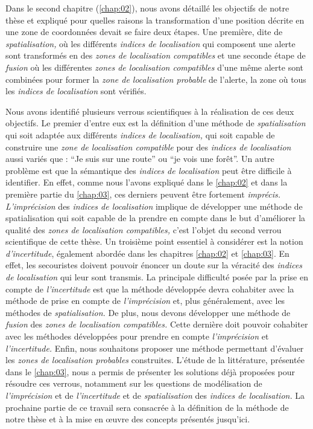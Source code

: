 Dans le second chapitre (\ref{chap:02}), nous avons détaillé les
objectifs de notre thèse et expliqué pour quelles raisons la
transformation d'une position décrite en une zone de coordonnées
devait se faire deux étapes. Une première, dite de
\emph{spatialisation,} où les différents \emph{indices de
  localisation} qui composent une alerte sont transformés en des
\emph{zones de localisation compatibles} et une seconde étape de
\emph{fusion} où les différentes \emph{zones de localisation
  compatibles} d'une même alerte sont combinées pour former la
\emph{zone de localisation probable} de l'alerte, \ie la zone où tous
les \emph{indices de localisation} sont vérifiés.

Nous avons identifié plusieurs verrous scientifiques à la réalisation
de ces deux objectifs. Le premier d'entre eux est la définition d'une
méthode de \emph{spatialisation} qui soit adaptée aux différents
\emph{indices de localisation,} \ie qui soit capable de construire une
\emph{zone de localisation compatible} pour des \emph{indices de
  localisation} aussi variés que : \enquote{Je suis sur une route} ou
\enquote{je vois une forêt}.  Un autre problème est que la sémantique
des \emph{indices de localisation} peut être difficile à
identifier. En effet, comme nous l'avons expliqué dans le
\autoref{chap:02} et dans la première partie du \autoref{chap:03}, ces
derniers peuvent être fortement \emph{imprécis.} \emph{L'imprécision}
des \emph{indices de localisation} implique de développer une méthode
de spatialisation qui soit capable de la prendre en compte dans le but
d'améliorer la qualité des \emph{zones de localisation compatibles,}
c'est l'objet du second verrou scientifique de cette thèse. Un
troisième point essentiel à considérer est la notion
\emph{d'incertitude}, également abordée dans les chapitres
\ref{chap:02} et \ref{chap:03}. En effet, les secouristes doivent
pouvoir énoncer un doute sur la véracité des \emph{indices de
  localisation} qui leur sont transmis. La principale difficulté posée
par la prise en compte de \emph{l'incertitude} est que la méthode
développée devra cohabiter avec la méthode de prise en compte de
\emph{l'imprécision} et, plus généralement, avec les méthodes de
\emph{spatialisation.} De plus, nous devons développer une méthode de
\emph{fusion} des \emph{zones de localisation compatibles.} Cette
dernière doit pouvoir cohabiter avec les méthodes développées pour
prendre en compte \emph{l'imprécision} et \emph{l'incertitude.} Enfin,
nous souhaitons proposer une méthode permettant d'évaluer les
\emph{zones de localisation probables} construites. L'étude de la
littérature, présentée dans le \autoref{chap:03}, nous a permis de
présenter les solutions déjà proposées pour résoudre ces verrous,
notamment sur les questions de modélisation de \emph{l'imprécision} et
de \emph{l'incertitude} et de \emph{spatialisation} des \emph{indices
  de localisation.} La prochaine partie de ce travail sera consacrée à
la définition de la méthode de notre thèse et à la mise en œuvre des
concepts présentés jusqu'ici.

